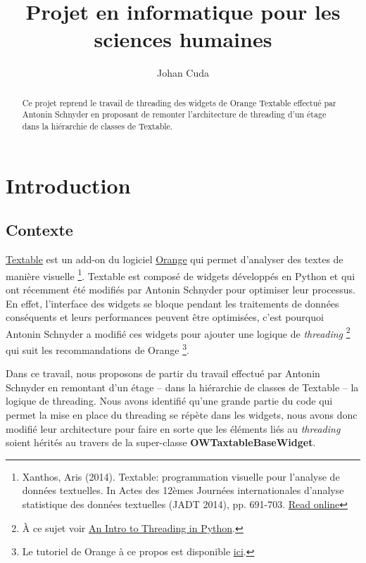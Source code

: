 \documentclass{article}
\title{Projet en informatique pour les sciences humaines}
\author{Johan Cuda}
\begin{document}
\maketitle

\begin{abstract}
Ce projet reprend le travail de threading des widgets de Orange Textable effectué par Antonin Schnyder en proposant de remonter l'architecture de threading d'un étage dans la hiérarchie de classes de Textable. 
\end{abstract}

\tableofcontents

\section{Introduction}

\subsection{Contexte}

\href{http://textable.io/}{Textable} est un add-on du logiciel \href{https://orangedatamining.com/}{Orange} qui permet d'analyser des textes de manière visuelle \footnote{Xanthos, Aris (2014). Textable: programmation visuelle pour l’analyse de données textuelles. In Actes des 12èmes Journées internationales d’analyse statistique des données textuelles (JADT 2014), pp. 691-703. \href{http://lexicometrica.univ-paris3.fr/jadt/jadt2014/01-ACTES/57-JADT2014.pdf}{Read online}}. Textable est composé de widgets développés en Python et qui ont récemment été modifiés par Antonin Schnyder pour optimiser leur processus. En effet, l'interface des widgets se bloque pendant les traitements de données conséquents et leurs performances peuvent être optimisées, c'est pourquoi Antonin Schnyder a modifié ces widgets pour ajouter une logique de \textit{threading} \footnote{À ce sujet voir \href{https://realpython.com/intro-to-python-threading/}{An Intro to Threading in Python}.} qui suit les recommandations de Orange \footnote{Le tutoriel de Orange à ce propos est disponible \href{https://orange3.readthedocs.io/projects/orange-development/en/latest/tutorial-responsive-gui.html}{ici}.}.\newline

Dans ce travail, nous proposons de partir du travail effectué par Antonin Schnyder en remontant d'un étage – dans la hiérarchie de classes de Textable – la logique de threading. Nous avons identifié qu'une grande partie du code qui permet la mise en place du threading se répète dans les widgets, nous avons donc modifié  leur architecture pour faire en sorte que les éléments liés au \textit{threading} soient hérités au travers de la super-classe \textbf{OWTaxtableBaseWidget}.
\newline
\end{document}

